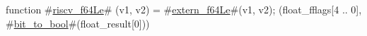 function #\hyperref[sailRISCVzriscvzyf64Le]{riscv\_f64Le}# (v1, v2) = {
  #\hyperref[sailRISCVzexternzyf64Le]{extern\_f64Le}#(v1, v2);
  (float_fflags[4 .. 0], #\hyperref[sailRISCVzbitzytozybool]{bit\_to\_bool}#(float_result[0]))
}
